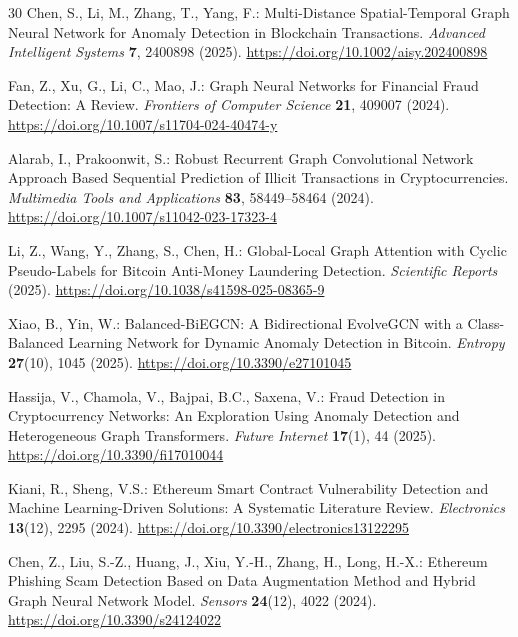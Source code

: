 \documentclass[12pt,a4paper]{article}
\begin{document}
\begin{thebibliography}{30}
  Chen, S., Li, M., Zhang, T., Yang, F.:
  Multi-Distance Spatial-Temporal Graph Neural Network
  for Anomaly Detection in Blockchain Transactions.
  \textit{Advanced Intelligent Systems} \textbf{7}, 2400898
  (2025).
  \url{https://doi.org/10.1002/aisy.202400898}

  Fan, Z., Xu, G., Li, C., Mao, J.:
  Graph Neural Networks for Financial Fraud Detection:
  A Review.
  \textit{Frontiers of Computer Science} \textbf{21},
  409007 (2024).
  \url{https://doi.org/10.1007/s11704-024-40474-y}

  Alarab, I., Prakoonwit, S.:
  Robust Recurrent Graph Convolutional Network Approach
  Based Sequential Prediction of Illicit Transactions in
  Cryptocurrencies.
  \textit{Multimedia Tools and Applications} \textbf{83},
  58449--58464 (2024).
  \url{https://doi.org/10.1007/s11042-023-17323-4}

  Li, Z., Wang, Y., Zhang, S., Chen, H.:
  Global-Local Graph Attention with Cyclic Pseudo-Labels
  for Bitcoin Anti-Money Laundering Detection.
  \textit{Scientific Reports} (2025).
  \url{https://doi.org/10.1038/s41598-025-08365-9}

  Xiao, B., Yin, W.:
  Balanced-BiEGCN: A Bidirectional EvolveGCN with a
  Class-Balanced Learning Network for Dynamic Anomaly
  Detection in Bitcoin.
  \textit{Entropy} \textbf{27}(10), 1045 (2025).
  \url{https://doi.org/10.3390/e27101045}

  Hassija, V., Chamola, V., Bajpai, B.C., Saxena, V.:
  Fraud Detection in Cryptocurrency Networks: An
  Exploration Using Anomaly Detection and Heterogeneous
  Graph Transformers.
  \textit{Future Internet} \textbf{17}(1), 44 (2025).
  \url{https://doi.org/10.3390/fi17010044}

  Kiani, R., Sheng, V.S.:
  Ethereum Smart Contract Vulnerability Detection and
  Machine Learning-Driven Solutions: A Systematic
  Literature Review.
  \textit{Electronics} \textbf{13}(12), 2295 (2024).
  \url{https://doi.org/10.3390/electronics13122295}

  Chen, Z., Liu, S.-Z., Huang, J., Xiu, Y.-H., Zhang, H.,
  Long, H.-X.:
  Ethereum Phishing Scam Detection Based on Data
  Augmentation Method and Hybrid Graph Neural Network
  Model.
  \textit{Sensors} \textbf{24}(12), 4022 (2024).
  \url{https://doi.org/10.3390/s24124022}


\end{thebibliography}
\end{document}
